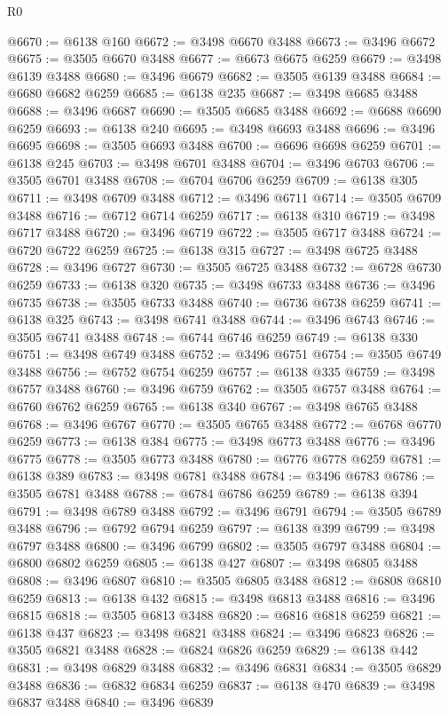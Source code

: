 \begin{lexlean}{R0}
\begin{coremodule}
@6670 := @6138 @160
@6672 := @3498 @6670 @3488
@6673 := @3496 @6672
@6675 := @3505 @6670 @3488
@6677 := @6673 @6675 @6259
@6679 := @3498 @6139 @3488
@6680 := @3496 @6679
@6682 := @3505 @6139 @3488
@6684 := @6680 @6682 @6259
@6685 := @6138 @235
@6687 := @3498 @6685 @3488
@6688 := @3496 @6687
@6690 := @3505 @6685 @3488
@6692 := @6688 @6690 @6259
@6693 := @6138 @240
@6695 := @3498 @6693 @3488
@6696 := @3496 @6695
@6698 := @3505 @6693 @3488
@6700 := @6696 @6698 @6259
@6701 := @6138 @245
@6703 := @3498 @6701 @3488
@6704 := @3496 @6703
@6706 := @3505 @6701 @3488
@6708 := @6704 @6706 @6259
@6709 := @6138 @305
@6711 := @3498 @6709 @3488
@6712 := @3496 @6711
@6714 := @3505 @6709 @3488
@6716 := @6712 @6714 @6259
@6717 := @6138 @310
@6719 := @3498 @6717 @3488
@6720 := @3496 @6719
@6722 := @3505 @6717 @3488
@6724 := @6720 @6722 @6259
@6725 := @6138 @315
@6727 := @3498 @6725 @3488
@6728 := @3496 @6727
@6730 := @3505 @6725 @3488
@6732 := @6728 @6730 @6259
@6733 := @6138 @320
@6735 := @3498 @6733 @3488
@6736 := @3496 @6735
@6738 := @3505 @6733 @3488
@6740 := @6736 @6738 @6259
@6741 := @6138 @325
@6743 := @3498 @6741 @3488
@6744 := @3496 @6743
@6746 := @3505 @6741 @3488
@6748 := @6744 @6746 @6259
@6749 := @6138 @330
@6751 := @3498 @6749 @3488
@6752 := @3496 @6751
@6754 := @3505 @6749 @3488
@6756 := @6752 @6754 @6259
@6757 := @6138 @335
@6759 := @3498 @6757 @3488
@6760 := @3496 @6759
@6762 := @3505 @6757 @3488
@6764 := @6760 @6762 @6259
@6765 := @6138 @340
@6767 := @3498 @6765 @3488
@6768 := @3496 @6767
@6770 := @3505 @6765 @3488
@6772 := @6768 @6770 @6259
@6773 := @6138 @384
@6775 := @3498 @6773 @3488
@6776 := @3496 @6775
@6778 := @3505 @6773 @3488
@6780 := @6776 @6778 @6259
@6781 := @6138 @389
@6783 := @3498 @6781 @3488
@6784 := @3496 @6783
@6786 := @3505 @6781 @3488
@6788 := @6784 @6786 @6259
@6789 := @6138 @394
@6791 := @3498 @6789 @3488
@6792 := @3496 @6791
@6794 := @3505 @6789 @3488
@6796 := @6792 @6794 @6259
@6797 := @6138 @399
@6799 := @3498 @6797 @3488
@6800 := @3496 @6799
@6802 := @3505 @6797 @3488
@6804 := @6800 @6802 @6259
@6805 := @6138 @427
@6807 := @3498 @6805 @3488
@6808 := @3496 @6807
@6810 := @3505 @6805 @3488
@6812 := @6808 @6810 @6259
@6813 := @6138 @432
@6815 := @3498 @6813 @3488
@6816 := @3496 @6815
@6818 := @3505 @6813 @3488
@6820 := @6816 @6818 @6259
@6821 := @6138 @437
@6823 := @3498 @6821 @3488
@6824 := @3496 @6823
@6826 := @3505 @6821 @3488
@6828 := @6824 @6826 @6259
@6829 := @6138 @442
@6831 := @3498 @6829 @3488
@6832 := @3496 @6831
@6834 := @3505 @6829 @3488
@6836 := @6832 @6834 @6259
@6837 := @6138 @470
@6839 := @3498 @6837 @3488
@6840 := @3496 @6839

\end{coremodule}
\end{lexlean}
